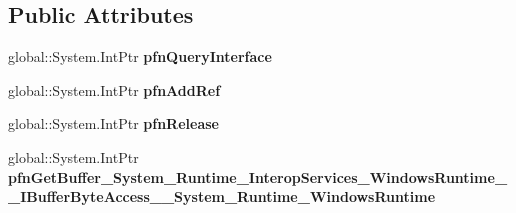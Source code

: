 \subsection*{Public Attributes}
\begin{DoxyCompactItemize}
\item 
\mbox{\label{struct_system_1_1_runtime_1_1_interop_services_1_1_windows_runtime_1_1_i_buffer_byte_access_____6d4d383a825dd9054acf9d9a911f036f_aebe92105224b92515c70b46f0c2cb68b}} 
global\+::\+System.\+Int\+Ptr {\bfseries pfn\+Query\+Interface}
\item 
\mbox{\label{struct_system_1_1_runtime_1_1_interop_services_1_1_windows_runtime_1_1_i_buffer_byte_access_____6d4d383a825dd9054acf9d9a911f036f_a522d2c7258120db47b8899948c9002c5}} 
global\+::\+System.\+Int\+Ptr {\bfseries pfn\+Add\+Ref}
\item 
\mbox{\label{struct_system_1_1_runtime_1_1_interop_services_1_1_windows_runtime_1_1_i_buffer_byte_access_____6d4d383a825dd9054acf9d9a911f036f_aa41ee11b061610545143cdcf017ae2ea}} 
global\+::\+System.\+Int\+Ptr {\bfseries pfn\+Release}
\item 
\mbox{\label{struct_system_1_1_runtime_1_1_interop_services_1_1_windows_runtime_1_1_i_buffer_byte_access_____6d4d383a825dd9054acf9d9a911f036f_ab3f22ef9aa1289b5c409f6798ead4931}} 
global\+::\+System.\+Int\+Ptr {\bfseries pfn\+Get\+Buffer\+\_\+\+System\+\_\+\+Runtime\+\_\+\+Interop\+Services\+\_\+\+Windows\+Runtime\+\_\+\+\_\+\+I\+Buffer\+Byte\+Access\+\_\+\+\_\+\+System\+\_\+\+Runtime\+\_\+\+Windows\+Runtime}
\end{DoxyCompactItemize}
